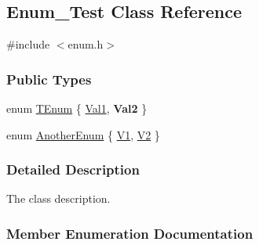 \hypertarget{class_enum___test}{}\subsection{Enum\+\_\+\+Test Class Reference}
\label{class_enum___test}


{\ttfamily \#include $<$enum.\+h$>$}

\subsubsection*{Public Types}
\begin{DoxyCompactItemize}
\item 
enum \hyperlink{class_enum___test_a8d096bc026dbb395991f02e3ca86eb1c}{T\+Enum} \{ \hyperlink{class_enum___test_a8d096bc026dbb395991f02e3ca86eb1ca88efe763d7807db8a48f6e685277d7fd}{Val1}, 
{\bfseries Val2}
 \}
\item 
enum \hyperlink{class_enum___test_a633286511e19b996e97699d7dd2cd2a0}{Another\+Enum} \{ \hyperlink{class_enum___test_a633286511e19b996e97699d7dd2cd2a0ab0e5fe049a18d196b564c00bb241722f}{V1}, 
\hyperlink{class_enum___test_a633286511e19b996e97699d7dd2cd2a0ae83b4255ceeedf0c49dd65d1eff8b750}{V2}
 \}
\end{DoxyCompactItemize}


\subsubsection{Detailed Description}
The class description. 

\subsubsection{Member Enumeration Documentation}
